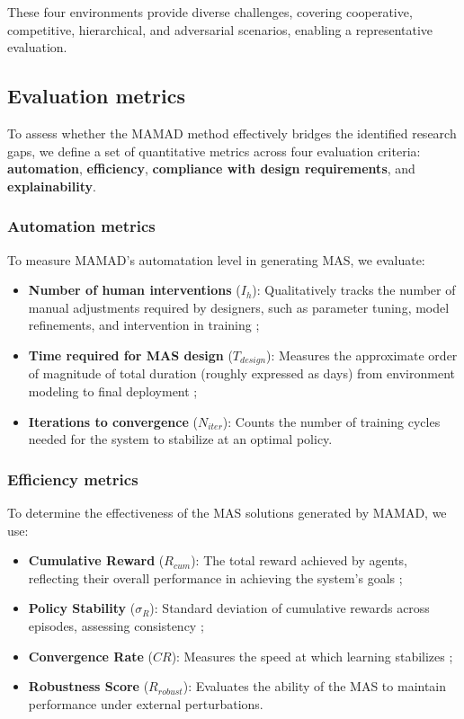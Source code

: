 \documentclass[pdflatex,sn-mathphys-num]{sn-jnl}%
\theoremstyle{thmstyleone}%
\theoremstyle{thmstyletwo}%
\theoremstyle{thmstylethree}%
\begin{document}
\noindent These four environments provide diverse challenges, covering cooperative, competitive, hierarchical, and adversarial scenarios, enabling a representative evaluation.


\subsection{Evaluation metrics}

To assess whether the MAMAD method effectively bridges the identified research gaps, we define a set of quantitative metrics across four evaluation criteria: \textbf{automation}, \textbf{efficiency}, \textbf{compliance with design requirements}, and \textbf{explainability}.

\subsubsection{Automation metrics}
To measure MAMAD's automatation level in generating MAS, we evaluate:
\begin{itemize}
    \item \textbf{Number of human interventions} ($I_h$): Qualitatively tracks the number of manual adjustments required by designers, such as parameter tuning, model refinements, and intervention in training ;
    \item \textbf{Time required for MAS design} ($T_{design}$): Measures the approximate order of magnitude of total duration (roughly expressed as days) from environment modeling to final deployment ;
    \item \textbf{Iterations to convergence} ($N_{iter}$): Counts the number of training cycles needed for the system to stabilize at an optimal policy.
\end{itemize}

\subsubsection{Efficiency metrics}
To determine the effectiveness of the MAS solutions generated by MAMAD, we use:
\begin{itemize}
    \item \textbf{Cumulative Reward} ($R_{cum}$): The total reward achieved by agents, reflecting their overall performance in achieving the system's goals ;
    \item \textbf{Policy Stability} ($\sigma_R$): Standard deviation of cumulative rewards across episodes, assessing consistency ;
    \item \textbf{Convergence Rate} ($CR$): Measures the speed at which learning stabilizes ;
    \item \textbf{Robustness Score} ($R_{robust}$): Evaluates the ability of the MAS to maintain performance under external perturbations.
\end{itemize}
\end{document}
